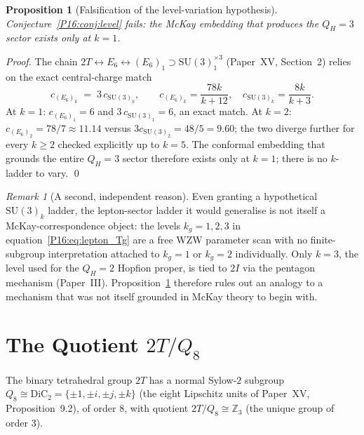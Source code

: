 \documentclass[11pt,a4paper]{article}
\newtheorem{proposition}[theorem]{Proposition}
\theoremstyle{definition}\newtheorem{definition}[theorem]{Definition}
\theoremstyle{remark}
\newtheorem{remark}[theorem]{Remark}
\theoremstyle{definition}\newtheorem{construction}[theorem]{Construction}
\newcommand{\SU}{\mathrm{SU}}
\newcommand{\twoI}{2I}
\newcommand{\twoT}{2T}
\newcommand{\QH}{Q_H}
\begin{document}
\begin{proposition}[Falsification of the level-variation hypothesis]
\label{P16:prop:level_fail}
Conjecture~\ref{P16:conj:level} fails: the McKay embedding that produces
the $\QH=3$ sector exists only at $k=1$.
\end{proposition}

\begin{proof}
The chain $\twoT\leftrightarrow E_6\leftrightarrow(E_6)_1\supset
\SU(3)_1^{\times3}$ (Paper~XV, Section~2) relies on the exact
central-charge match
\begin{equation}
  c_{(E_6)_k} \;=\; 3\,c_{\SU(3)_k},
  \qquad
  c_{(E_6)_k}=\frac{78k}{k+12},
  \quad
  c_{\SU(3)_k}=\frac{8k}{k+3}.
  \label{P16:eq:central_charge_match}
\end{equation}
At $k=1$: $c_{(E_6)_1}=6$ and $3\,c_{\SU(3)_1}=6$, an exact match. At
$k=2$: $c_{(E_6)_2}=78/7\approx11.14$ versus $3c_{\SU(3)_2}=48/5=9.60$;
the two diverge further for every $k\geq2$ checked explicitly up to
$k=5$. The conformal embedding that grounds the entire $\QH=3$ sector
therefore exists only at $k=1$; there is no $k$-ladder to vary.
\qed
\end{proof}

\begin{remark}[A second, independent reason]
\label{P16:rem:no_target}
Even granting a hypothetical $\SU(3)_k$ ladder, the lepton-sector
ladder it would generalise is not itself a McKay-correspondence
object: the levels $k_g=1,2,3$ in equation~\eqref{P16:eq:lepton_Tg} are a
free WZW parameter scan with no finite-subgroup interpretation
attached to $k_g=1$ or $k_g=2$ individually. Only $k=3$, the level
used for the $\QH=2$ Hopfion proper, is tied to $\twoI$ via the
pentagon mechanism (Paper~III). Proposition~\ref{P16:prop:level_fail}
therefore rules out an analogy to a mechanism that was not itself
grounded in McKay theory to begin with.
\end{remark}

\section{The Quotient $\twoT/Q_8$}
\label{P16:sec:q8}

The binary tetrahedral group $\twoT$ has a normal Sylow-$2$ subgroup
$Q_8\cong\mathrm{DiC}_2=\{\pm1,\pm i,\pm j,\pm k\}$ (the eight Lipschitz
units of Paper~XV, Proposition~9.2), of order $8$, with quotient
$\twoT/Q_8\cong\mathbb{Z}_3$ (the unique group of order $3$).
\end{document}
